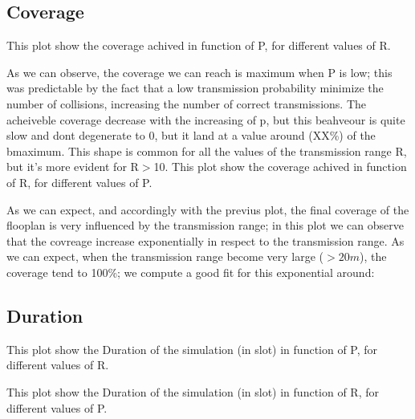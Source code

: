 \subsection{Coverage}
This plot show the coverage achived in function of P, for different values of R.
\begin{figure}[H]
    \begin{center}
    \end{center}
    \vspace*{-1cm}
\end{figure}
As we can observe, the coverage we can reach is maximum when P is low; this was predictable by the fact that a low transmission
probability minimize the number of collisions, increasing the number of correct transmissions. 
The acheiveble coverage decrease with the increasing of p, but this beahveour is quite slow and
dont degenerate to 0, but it land at a value around (XX\%) of the bmaximum. %
This shape is common for all the values of the transmission range R, but it's more evident for R$>$10.
This plot show the coverage achived in function of R, for different values of P.
\begin{figure}[H]
    \begin{center}
    \end{center}
    \vspace*{-1cm}
\end{figure}
As we can expect, and accordingly with the previus plot, the final coverage of the flooplan is very
influenced by the transmission range; in this plot we can observe that the covreage increase exponentially
in respect to the transmission range. As we can expect, when the transmission range become very large ($>20m$),
the coverage tend to 100\%; we compute a good fit for this exponential around: %

\subsection{Duration}
This plot show the Duration of the simulation (in slot) in function of P, for different values of R.
\begin{figure}[H]
    \begin{center}
    \end{center}
    \vspace*{-1cm}
\end{figure}
This plot show the Duration of the simulation (in slot) in function of R, for different values of P.
\begin{figure}[H]
    \begin{center}
    \end{center}
    \vspace*{-1cm}
\end{figure}

